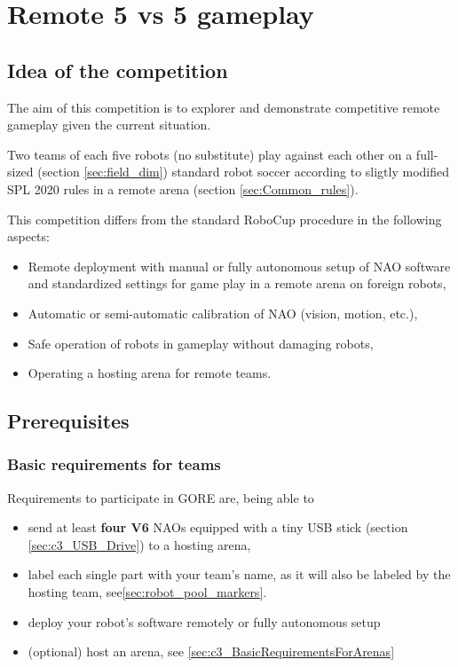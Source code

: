 \section{Remote 5 vs 5 gameplay}
\label{sec:OneVsOneChallenge}

\subsection{Idea of the competition}
The aim of this competition is to explorer and demonstrate  competitive remote gameplay given the current situation.

Two teams of each five robots (no substitute) play against each other on a full-sized (\cf section \ref{sec:field_dim}) standard robot soccer according to sligtly modified SPL 2020 rules in a remote arena (\cf section \ref{sec:Common_rules}). 

This competition differs from the standard RoboCup procedure in the following aspects:
\begin{itemize}
    \item Remote deployment with manual or fully autonomous setup of NAO software and standardized settings for game play in a remote arena on foreign robots,
    \item Automatic or semi-automatic calibration of NAO (vision, motion, etc.), 
    \item Safe operation of robots in gameplay without damaging robots,
    \item Operating a hosting arena for remote teams. 
\end{itemize}

\subsection{Prerequisites}
\label{sec:c3_Prerequisites}

\subsubsection{Basic requirements for teams}

Requirements to participate in GORE are, being able to
\begin{itemize}
    \item send at least \textbf{four V6} NAOs equipped with a tiny USB stick (\cf section \ref{sec:c3_USB_Drive}) to a hosting arena,
    \item label each single part with your team's name, as it will also be labeled by the hosting team, see\ref{sec:robot_pool_markers}.
	\item deploy your robot's software remotely or fully autonomous setup
	\item (optional) host an arena, see \ref{sec:c3_BasicRequirementsForArenas}
\end{itemize}

